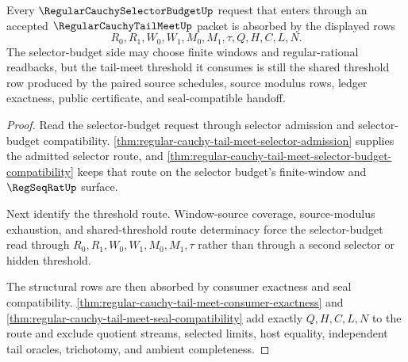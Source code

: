 \begin{theorem}
\label{thm:regular-cauchy-tail-meet-selector-budget-absorption}
Every $\RegularCauchySelectorBudgetUp$ request that enters through an accepted $\RegularCauchyTailMeetUp$ packet is absorbed by the displayed rows
$$
R_0,R_1,W_0,W_1,M_0,M_1,\tau,Q,H,C,L,N.
$$
The selector-budget side may choose finite windows and regular-rational readbacks, but the tail-meet threshold it consumes is still the shared threshold row produced by the paired source schedules, source modulus rows, ledger exactness, public certificate, and seal-compatible handoff.
\end{theorem}
\begin{proof}
Read the selector-budget request through selector admission and selector-budget compatibility. \autoref{thm:regular-cauchy-tail-meet-selector-admission} supplies the admitted selector route, and \autoref{thm:regular-cauchy-tail-meet-selector-budget-compatibility} keeps that route on the selector budget's finite-window and $\RegSeqRatUp$ surface.

Next identify the threshold route. Window-source coverage, source-modulus exhaustion, and shared-threshold route determinacy force the selector-budget read through $R_0,R_1,W_0,W_1,M_0,M_1,\tau$ rather than through a second selector or hidden threshold.

The structural rows are then absorbed by consumer exactness and seal compatibility. \autoref{thm:regular-cauchy-tail-meet-consumer-exactness} and \autoref{thm:regular-cauchy-tail-meet-seal-compatibility} add exactly $Q,H,C,L,N$ to the route and exclude quotient streams, selected limits, host equality, independent tail oracles, trichotomy, and ambient completeness.
\end{proof}

